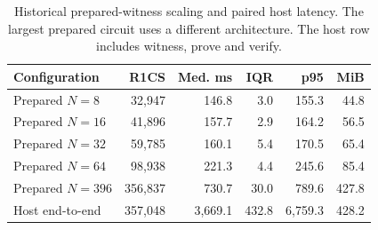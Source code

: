 \begin{table}[t]
\centering
\scriptsize
\setlength{\tabcolsep}{4pt}
\begin{tabular}{@{}lrrrrr@{}}
\toprule
Configuration & R1CS & Med. ms & IQR & p95 & MiB \\
\midrule
Prepared $N=8$ & 32,947 & 146.8 & 3.0 & 155.3 & 44.8 \\
Prepared $N=16$ & 41,896 & 157.7 & 2.9 & 164.2 & 56.5 \\
Prepared $N=32$ & 59,785 & 160.1 & 5.4 & 170.5 & 65.4 \\
Prepared $N=64$ & 98,938 & 221.3 & 4.4 & 245.6 & 85.4 \\
Prepared $N=396$ & 356,837 & 730.7 & 30.0 & 789.6 & 427.8 \\
\midrule
Host end-to-end & 357,048 & 3,669.1 & 432.8 & 6,759.3 & 428.2 \\
\bottomrule
\end{tabular}

\caption{Historical prepared-witness scaling and paired host latency. The largest prepared circuit uses a different architecture. The host row includes witness, prove and verify.}
\label{tab:scaling}
\end{table}
